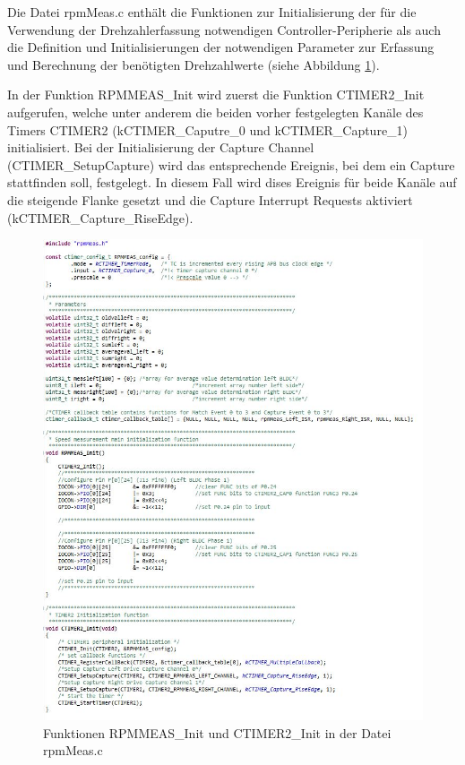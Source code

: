 Die Datei \glqq{}rpmMeas.c\grqq{} enthält die Funktionen zur Initialisierung der für die Verwendung der Drehzahlerfassung notwendigen Controller-Peripherie als auch die Definition und Initialisierungen der notwendigen Parameter zur Erfassung und Berechnung der benötigten Drehzahlwerte (siehe Abbildung \ref{fig:rpmMeasC0}).\vspace{11pt}

In der Funktion RPMMEAS\_Init wird zuerst die Funktion CTIMER2\_Init aufgerufen, welche unter anderem die beiden vorher festgelegten Kanäle des Timers CTIMER2 (\glqq{}kCTIMER\_Caputre\_0\grqq{} und \glqq{}kCTIMER\_Capture\_1\grqq{}) initialisiert. Bei der Initialisierung der Capture Channel (CTIMER\_SetupCapture) wird das entsprechende Ereignis, bei dem ein Capture stattfinden soll, festgelegt. In diesem Fall wird dises Ereignis für beide Kanäle auf die steigende Flanke gesetzt und die Capture Interrupt Requests aktiviert (\glqq{}kCTIMER\_Capture\_RiseEdge\grqq{}).

\begin{figure}[H] %
\includegraphics[width=.90\textwidth]{sec4/images/rpmmeas_init_ctimer2_init} 
\centering
\captionsetup{width=.95\textwidth}
\caption[Funktionen RPMMEAS\_Init und CTIMER2\_Init in der Datei \glqq{}rpmMeas.c\grqq{}]{Funktionen RPMMEAS\_Init und CTIMER2\_Init in der Datei \glqq{}rpmMeas.c\grqq{}}\centering
\label{fig:rpmMeasC0}
\end{figure}

